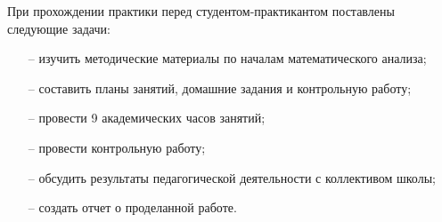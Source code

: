 





При прохождении практики перед студентом-практикантом поставлены следующие задачи:
\begin{itemize}
\item[--] изучить методические материалы по началам математического анализа;
\item[--] составить планы занятий, домашние задания и контрольную работу;
\item[--] провести 9 академических часов занятий;
\item[--] провести контрольную работу;
\item[--] обсудить результаты педагогической деятельности с коллективом школы;
\item[--] создать отчет о проделанной работе.
\end{itemize}

\SignaturesPattern


